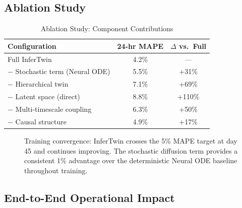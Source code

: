 \documentclass[conference,10pt]{IEEEtran}
\begin{document}
\subsection{Ablation Study}

\begin{table}[!htbp]
\caption{Ablation Study: Component Contributions}
\label{tab:ablation_sde}
\centering\scriptsize
\begin{tabular}{@{}lcc@{}}
\toprule
\textbf{Configuration} & \textbf{24-hr MAPE} & \textbf{$\Delta$ vs.\ Full} \\
\midrule
Full InferTwin & 4.2\% & --- \\
$-$ Stochastic term (Neural ODE) & 5.5\% & +31\% \\
$-$ Hierarchical twin & 7.1\% & +69\% \\
$-$ Latent space (direct) & 8.8\% & +110\% \\
$-$ Multi-timescale coupling & 6.3\% & +50\% \\
$-$ Causal structure & 4.9\% & +17\% \\
\bottomrule
\end{tabular}
\end{table}


\begin{figure}[!t]
\centering
{}
\caption{Training convergence: InferTwin crosses the 5\% MAPE target at day 45 and continues improving. The stochastic diffusion term provides a consistent 1\% advantage over the deterministic Neural ODE baseline throughout training.}
\label{fig:convergence}
\end{figure}

\subsection{End-to-End Operational Impact}
\end{document}

